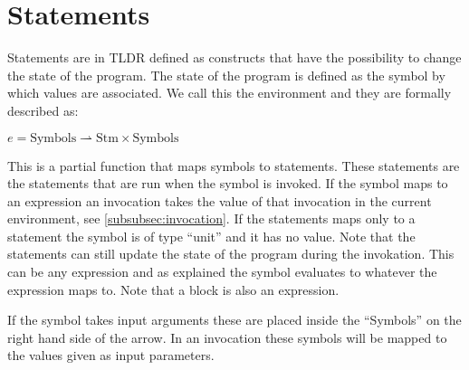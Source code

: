 \section{Statements}\label{sec:statements}
Statements are in TLDR defined as constructs that have the possibility to change the state of the program. The state of the program is defined as the symbol by which values are associated. We call this the environment and they are formally described as:

$e = \text{Symbols} \rightharpoonup \text{Stm} \times \text{Symbols}$

This is a partial function that maps symbols to statements. These statements are the statements that are run when the symbol is invoked. If the symbol maps to an expression an invocation takes the value of that invocation in the current environment, see \cref{subsubsec:invocation}. If the statements maps only to a statement the symbol is of type \enquote{unit} and it has no value. Note that the statements can still update the state of the program during the invokation. This can be any expression and as explained the symbol evaluates to whatever the expression maps to. Note that a block is also an expression.

If the symbol takes input arguments these are placed inside the \enquote{Symbols} on the right hand side of the arrow. In an invocation these symbols will be mapped to the values given as input parameters.







